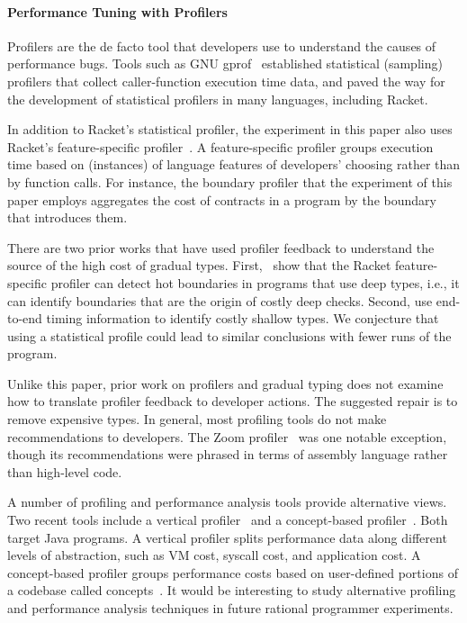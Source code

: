 \paragraph{Performance Tuning with Profilers} Profilers are the de facto
tool that developers use to understand the causes of performance bugs. 
Tools such as GNU gprof~\cite{gprof} established statistical (sampling) 
profilers that collect caller-function execution time data, and paved the
way for the development of statistical profilers in many languages,
including Racket.

In addition to Racket's statistical profiler, the experiment in this
paper also uses Racket's feature-specific
profiler~\cite{staaf-feature-prf}. A
feature-specific profiler
groups execution time based on (instances) of language features of
developers' choosing rather than by function calls.  For instance, the
boundary profiler that the experiment of this paper employs aggregates
the cost of contracts in a program by the boundary that introduces
them.

There are two prior works that have used profiler feedback to understand
the source of the high cost of gradual types.
First,~\citet{astavf-feature-prf} show that the Racket feature-specific profiler can detect
hot boundaries in programs that use deep types, i.e., it can
identify boundaries that are the origin of costly deep checks.
Second, \citet{grmhn-vmil-2019} use end-to-end timing information
to identify costly shallow types.
We conjecture that using a statistical profile could lead to similar
conclusions with fewer runs of the program.

Unlike this paper, prior work on profilers and gradual typing does not
examine how to translate profiler feedback to developer actions.
The suggested repair is to remove expensive types.
In general, most profiling tools do not make recommendations to
developers. The Zoom profiler~\cite{zoom} was one
notable exception, though its recommendations were phrased in
terms of assembly language rather than high-level code.

A number of profiling and performance analysis tools provide
alternative views. Two recent tools include
a vertical profiler~\cite{vertical-profiler} and a
concept-based profiler~\cite{java-profile-concepts}.
Both target Java programs.
A vertical profiler splits performance data along different
levels of abstraction, such as VM cost, syscall cost, and application
cost. A concept-based profiler groups performance costs based on
user-defined portions of a codebase called concepts~\cite{concepts}.
It would be interesting to study alternative profiling and performance
analysis techniques in future rational programmer experiments.


